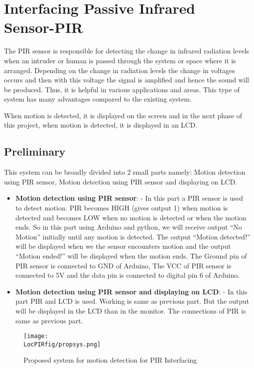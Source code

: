 \chapter {Interfacing Passive Infrared Sensor-PIR}
\thispagestyle{empty}
\label{ldr}

\newcommand{\LocPIRfig}{\Origin/user-code/pir/figures}
\newcommand{\LocPIRardcode}{\Origin/user-code/pir/arduino}
\newcommand{\LocPIRardbrief}[1]{{\tt
      \seqsplit{Origin/user-code/pir/arduino/#1}}}

\newcommand{\LocPIRpycode}{\Origin/user-code/pir/python}
\newcommand{\LocPIRpybrief}[1]{{\tt \seqsplit{%
        Origin/user-code/pir/python/#1}}}



The PIR sensor is responsible for detecting the change in infrared radiation levels when an intruder or human is passed through the system or space where it is arranged. Depending on the change in radiation levels the change in voltages occurs and then with this voltage the signal is amplified and hence the sound will be produced. Thus, it is helpful in various applications and areas. This type of system has many advantages compared to the existing system. 

When motion is detected, it is displayed on the screen and in the next phase of this project, when motion is detected, it is displayed in an LCD. 

\section{Preliminary}
This system can be broadly divided into 2 small parts namely:  Motion detection using PIR sensor, Motion detection using PIR sensor and displaying on LCD.
\begin{itemize}
  \item \textbf{Motion detection using PIR sensor}: - In this part a PIR sensor is used to detect motion. PIR becomes HIGH (gives output 1) when motion is detected and becomes LOW when no motion is detected or when the motion ends.
So in this part using Arduino and python, we will receive output “No Motion” initially until any motion is detected. The output “Motion detected!” will be displayed when we the sensor encounters motion and the output “Motion ended!” will be displayed when the motion ends. The Ground pin of PIR sensor is connected to GND of Arduino, The VCC of PIR sensor is connected to 5V and the data pin is connected to digital pin 6 of Arduino.

  \item \textbf{Motion detection using PIR sensor and displaying on LCD}: - In this part PIR and LCD is used. Working is same as previous part. But the output will be displayed in the LCD than in the monitor. The connections of PIR is same as previous part. 
\end{itemize}
\begin{figure}[hpt]
  \centering
    \texttt{[image: \\LocPIRfig/propsys.png]}
    \label{fig:propsys}
  \caption{Proposed system for motion detection for PIR Interfacing}
\end{figure} 


